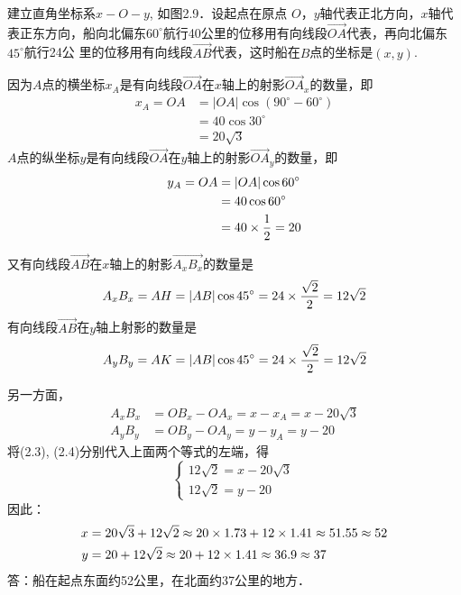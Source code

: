 \begin{solution}
    建立直角坐标系$x-O-y$, 如图2.9．设起点在原点
$O$，$y$轴代表正北方向，$x$轴代表正东方向，船向北偏东$60^{\circ}$航行40公里的位移用有向线段$\Vec{OA}$代表，再向北偏东$45^{\circ}$航行24公
里的位移用有向线段$\Vec{AB}$代表，这时船在$B$点的坐标是$(x,y)$.

因为$A$点的横坐标$x_A$是有向线段$\Vec{OA}$在$x$轴上的射影$\Vec{OA}_x$的数量，即
\begin{equation}
\begin{split}
      x_A=OA&=|OA|\cos(90^{\circ}-60^{\circ})\\
    &=  40\cos 30^{\circ}\\
    &=20\sqrt{3}
\end{split}
\end{equation}
$A$点的纵坐标$y$是有向线段$\Vec{OA}$在$y$轴上的射影$\Vec{OA}_y$的数量，即
\begin{equation}
    \begin{split}
y_A=OA&=|OA|\cos60^{\circ}\\
&=40\cos60^{\circ}\\
&=40\times\dfrac{1}{2}=20        
    \end{split}
\end{equation}

又有向线段$\Vec{AB}$在$x$轴上的射影$\Vec{A_xB_x}$的数量是
\begin{equation}
A_xB_x=AH=|AB|\cos45^{\circ}=24\times\dfrac{\sqrt{2}}{2}=12\sqrt{2}        
\end{equation}
有向线段$\Vec{AB}$在$y$轴上射影的数量是
\begin{equation}
    A_yB_y=AK=|AB|\cos45^{\circ}=24\times\dfrac{\sqrt{2}}{2}=12\sqrt{2}        
    \end{equation}

另一方面，
\[\begin{split}
    A_xB_x&=OB_x-OA_x=x-x_A=x-20\sqrt{3}\\
    A_yB_y&=OB_y-OA_y=y-y_A=y-20 
\end{split}\]
将(2.3), (2.4)分别代入上面两个等式的左端，得
\[\begin{cases}
    12\sqrt{2}=x-20\sqrt{3}\\
    12\sqrt{2}=y-20
\end{cases}\]
因此：
\[\begin{split}
    x&=20\sqrt{3}+12\sqrt{2}\approx 20\times 1.73+12\times 1.41 \approx 51.55\approx 52\\
    y&=20+12\sqrt{2}\approx 20+12\times 1.41\approx 36.9\approx 37
\end{split}\]
答：船在起点东面约52公里，在北面约37公里的地方．
\end{solution}


